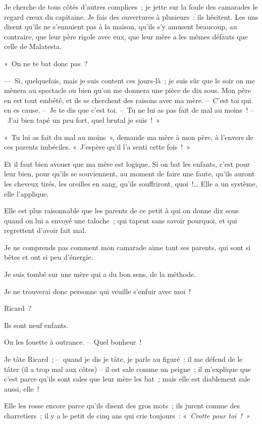 \documentclass[french,twoside]{book} %
\begin{document}
Je cherche de tous côtés d’autres complices ; je jette sur la foule des camarades le regard creux du capitaine. Je fais des ouvertures à plusieurs : ils hésitent. Les uns disent qu’ils ne s’ennuient pas à la maison, qu’ils s’y amusent beaucoup, au contraire, que leur père rigole avec eux, que leur mère a les mêmes défauts que celle de Malatesta.\par
« On ne te bat donc pas ?\par
— Si, quelquefois, mais je suis content ces jours-là ; je suis sûr que le soir on me mènera au spectacle ou bien qu’on me donnera une pièce de dix sous. Mon père en est tout embêté, et ils se cherchent des raisons avec ma mère. – C’est toi qui en es cause. – Je te dis que c’est toi. – Tu ne lui as pas fait de mal au moins ! – J’ai bien tapé un peu fort, quel brutal je suis ! »\par
« Tu lui as fait du mal au moins », demande ma mère à mon père, à l’envers de ces parents imbéciles. « J’espère qu’il l’a senti cette fois ! »\par
Et il faut bien avouer que ma mère est logique. Si on bat les enfants, c’est pour leur bien, pour qu’ils se souviennent, au moment de faire une faute, qu’ils auront les cheveux tirés, les oreilles en sang, qu’ils souffriront, quoi !… Elle a un système, elle l’applique.\par
Elle est plus raisonnable que les parents de ce petit à qui on donne dix sous quand on lui a envoyé une taloche ; qui tapent sans savoir pourquoi, et qui regrettent d’avoir fait mal.\par
Je ne comprends pas comment mon camarade aime tant ses parents, qui sont si bêtes et ont si peu d’énergie.\par
Je suis tombé sur une mère qui a du bon sens, de la méthode.\par
\bigbreak
\noindent Je ne trouverai donc personne qui veuille s’enfuir avec moi !\par
Ricard ?\par
Ils sont neuf enfants.\par
On les fouette à outrance. – Quel bonheur !\par
Je tâte Ricard ; – quand je dis je tâte, je parle au figuré : il me défend de le tâter (il a trop mal aux côtes) – il est sale comme un peigne ; il m’explique que c’est parce qu’ils sont sales que leur mère les bat ; mais elle est diablement sale aussi, elle !\par
Elle les rosse encore parce qu’ils disent des gros mots ; ils jurent comme des charretiers ; il y a le petit de cinq ans qui crie toujours : « \emph{Crotte pour toi ! »}\par
\end{document}
